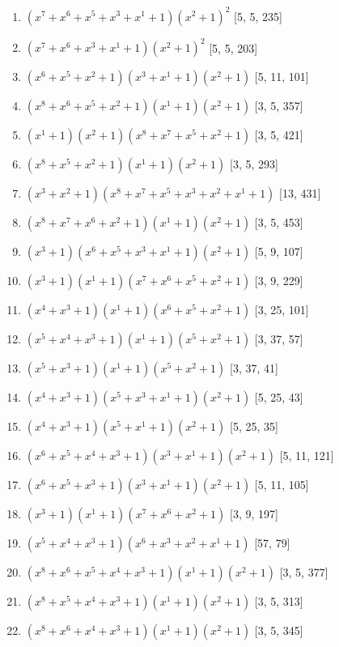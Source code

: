 \documentclass[10pt,twocolumn]{article}
\begin{document}
\begin{enumerate}
\item $(x^{7} + x^{6} + x^{5} + x^{3} + x^{1} + 1)(x^{2} + 1)^{2}$  [5, 5, 235]
\item $(x^{7} + x^{6} + x^{3} + x^{1} + 1)(x^{2} + 1)^{2}$  [5, 5, 203]
\item $(x^{6} + x^{5} + x^{2} + 1)(x^{3} + x^{1} + 1)(x^{2} + 1)$  [5, 11, 101]
\item $(x^{8} + x^{6} + x^{5} + x^{2} + 1)(x^{1} + 1)(x^{2} + 1)$  [3, 5, 357]
\item $(x^{1} + 1)(x^{2} + 1)(x^{8} + x^{7} + x^{5} + x^{2} + 1)$  [3, 5, 421]
\item $(x^{8} + x^{5} + x^{2} + 1)(x^{1} + 1)(x^{2} + 1)$  [3, 5, 293]
\item $(x^{3} + x^{2} + 1)(x^{8} + x^{7} + x^{5} + x^{3} + x^{2} + x^{1} + 1)$  [13, 431]
\item $(x^{8} + x^{7} + x^{6} + x^{2} + 1)(x^{1} + 1)(x^{2} + 1)$  [3, 5, 453]
\item $(x^{3} + 1)(x^{6} + x^{5} + x^{3} + x^{1} + 1)(x^{2} + 1)$  [5, 9, 107]
\item $(x^{3} + 1)(x^{1} + 1)(x^{7} + x^{6} + x^{5} + x^{2} + 1)$  [3, 9, 229]
\item $(x^{4} + x^{3} + 1)(x^{1} + 1)(x^{6} + x^{5} + x^{2} + 1)$  [3, 25, 101]
\item $(x^{5} + x^{4} + x^{3} + 1)(x^{1} + 1)(x^{5} + x^{2} + 1)$  [3, 37, 57]
\item $(x^{5} + x^{3} + 1)(x^{1} + 1)(x^{5} + x^{2} + 1)$  [3, 37, 41]
\item $(x^{4} + x^{3} + 1)(x^{5} + x^{3} + x^{1} + 1)(x^{2} + 1)$  [5, 25, 43]
\item $(x^{4} + x^{3} + 1)(x^{5} + x^{1} + 1)(x^{2} + 1)$  [5, 25, 35]
\item $(x^{6} + x^{5} + x^{4} + x^{3} + 1)(x^{3} + x^{1} + 1)(x^{2} + 1)$  [5, 11, 121]
\item $(x^{6} + x^{5} + x^{3} + 1)(x^{3} + x^{1} + 1)(x^{2} + 1)$  [5, 11, 105]
\item $(x^{3} + 1)(x^{1} + 1)(x^{7} + x^{6} + x^{2} + 1)$  [3, 9, 197]
\item $(x^{5} + x^{4} + x^{3} + 1)(x^{6} + x^{3} + x^{2} + x^{1} + 1)$  [57, 79]
\item $(x^{8} + x^{6} + x^{5} + x^{4} + x^{3} + 1)(x^{1} + 1)(x^{2} + 1)$  [3, 5, 377]
\item $(x^{8} + x^{5} + x^{4} + x^{3} + 1)(x^{1} + 1)(x^{2} + 1)$  [3, 5, 313]
\item $(x^{8} + x^{6} + x^{4} + x^{3} + 1)(x^{1} + 1)(x^{2} + 1)$  [3, 5, 345]

\end{enumerate}
\end{document}
